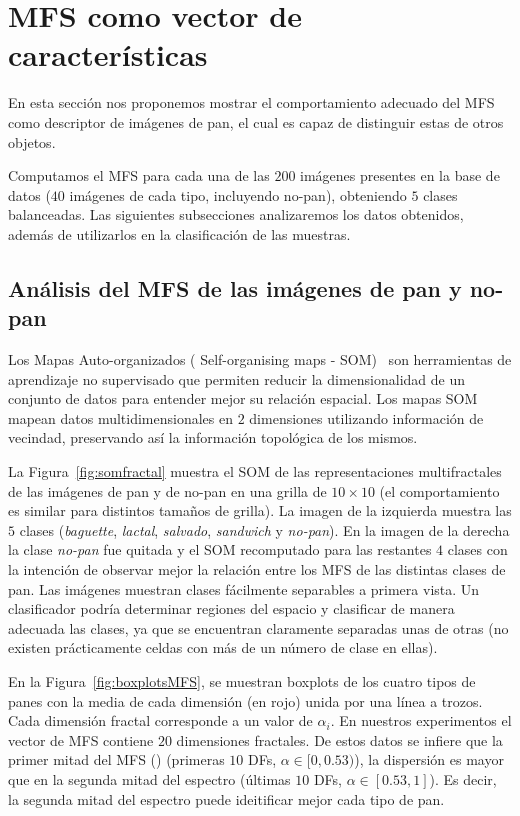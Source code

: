 \documentclass[spanish,a4paper,11pt,oneside,links]{report}
\begin{document}
\section{MFS como vector de caracter\'isticas}

En esta sección nos proponemos mostrar el comportamiento adecuado del MFS como descriptor de imágenes de pan, el cual es capaz de distinguir estas de otros objetos.

Computamos el MFS para cada una de las $200$ imágenes presentes en la base de datos ($40$ imágenes de cada tipo, incluyendo no-pan), obteniendo $5$ clases balanceadas.  Las siguientes subsecciones analizaremos los datos obtenidos, además de utilizarlos en la clasificación de las muestras.

\subsection{Análisis del MFS de las imágenes de pan y no-pan}

Los Mapas Auto-organizados ( Self-organising maps -  SOM)~\cite{Kohonen2001} son herramientas de aprendizaje no supervisado que permiten reducir la dimensionalidad de un conjunto de datos para entender mejor su relación espacial. Los mapas SOM mapean datos multidimensionales en $2$ dimensiones utilizando información de vecindad, preservando así la información topológica de los mismos.

La Figura~\ref{fig:somfractal} muestra el  SOM de las representaciones multifractales de las imágenes de pan y de no-pan en una grilla de $10\times 10$ (el comportamiento es similar para distintos tamaños de grilla). La imagen de la izquierda muestra las $5$ clases ({\em baguette}, {\em lactal}, {\em salvado}, {\em sandwich} y {\em no-pan}). En la imagen de la derecha la clase {\em no-pan} fue quitada y el SOM recomputado para las restantes $4$ clases con la intención de observar mejor la relación entre los MFS de las distintas clases de pan. Las imágenes muestran clases fácilmente separables a primera vista. Un clasificador podría determinar regiones del espacio y clasificar de manera adecuada las clases, ya que se encuentran claramente separadas unas de otras (no existen prácticamente celdas con más de un número de clase en ellas).

En la Figura~\ref{fig:boxplotsMFS}, se muestran boxplots de los cuatro tipos de panes con la media de cada dimensión (en rojo) unida por una línea a trozos. Cada dimensión fractal corresponde a un valor de $\alpha_{i}$. En nuestros experimentos el vector de MFS contiene $20$ dimensiones fractales. De estos datos se infiere que la primer mitad del MFS () (primeras $10$ DFs, $\alpha \in [0,0.53)$), la dispersión es mayor que en la segunda mitad del espectro  (últimas $10$ DFs, $\alpha \in [0.53,1]$). Es decir, la segunda mitad del espectro puede ideitificar mejor cada tipo de pan.
\end{document}
